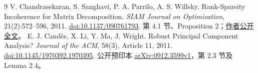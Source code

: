 \documentclass[UTF8,fontset=none,zihao=-4,a4paper]{ctexart}
\theoremstyle{plainzh}
\numberwithin{equation}{section}
\begin{document}
\begin{thebibliography}{9}
V. Chandrasekaran, S. Sanghavi, P. A. Parrilo, A. S. Willsky.
Rank-Sparsity Incoherence for Matrix Decomposition.
\emph{SIAM Journal on Optimization}, 21(2):572--596, 2011.
\href{https://doi.org/10.1137/090761793}{doi:10.1137/090761793}.
第 4.1 节、Proposition 2；\href{https://willsky.lids.mit.edu/publ_pdfs/206_pub_SIAMonline.pdf}{作者公开全文}。
E. J. Cand\`es, X. Li, Y. Ma, J. Wright.
Robust Principal Component Analysis? \emph{Journal of the ACM}, 58(3), Article 11, 2011.
\href{https://doi.org/10.1145/1970392.1970395}{doi:10.1145/1970392.1970395}.
公开预印本 \href{https://arxiv.org/abs/0912.3599v1}{arXiv:0912.3599v1}，第 2.3 节及 Lemma 2.4。
\end{thebibliography}
\end{document}
